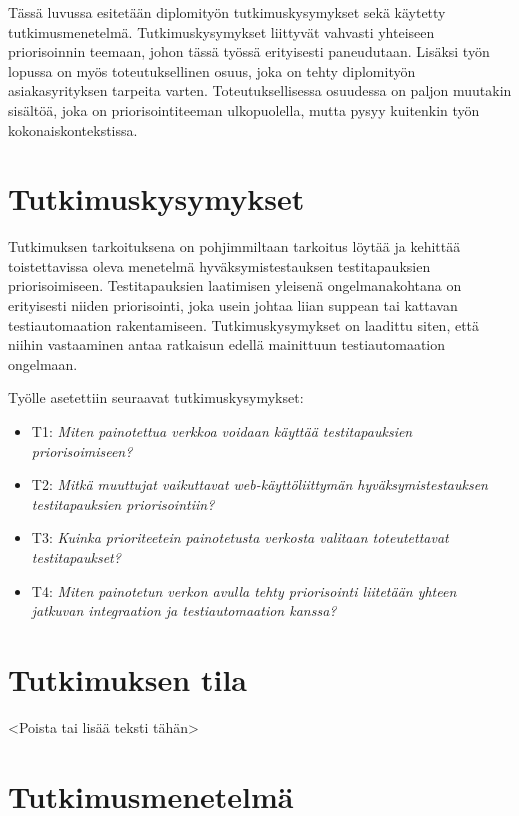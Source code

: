 Tässä luvussa esitetään diplomityön tutkimuskysymykset sekä käytetty tutkimusmenetelmä.
Tutkimuskysymykset liittyvät vahvasti yhteiseen priorisoinnin teemaan, johon tässä työssä erityisesti paneudutaan.
Lisäksi työn lopussa on myös toteutuksellinen osuus, joka on tehty diplomityön asiakasyrityksen tarpeita varten.
Toteutuksellisessa osuudessa on paljon muutakin sisältöä, joka on priorisointiteeman ulkopuolella, mutta pysyy kuitenkin työn kokonaiskontekstissa.

\section{Tutkimuskysymykset}

Tutkimuksen tarkoituksena on pohjimmiltaan tarkoitus löytää ja kehittää toistettavissa oleva menetelmä hyväksymistestauksen testitapauksien priorisoimiseen.
Testitapauksien laatimisen yleisenä ongelmanakohtana on erityisesti niiden priorisointi, joka usein johtaa liian suppean tai kattavan testiautomaation rakentamiseen.
Tutkimuskysymykset on laadittu siten, että niihin vastaaminen antaa ratkaisun edellä mainittuun testiautomaation ongelmaan.

Työlle asetettiin seuraavat tutkimuskysymykset:
\begin{itemize}
	\item T1: \emph{Miten painotettua verkkoa voidaan käyttää testitapauksien priorisoimiseen?}
  \item T2: \emph{Mitkä muuttujat vaikuttavat web-käyttöliittymän hyväksymistestauksen testitapauksien priorisointiin?}
  \item T3: \emph{Kuinka prioriteetein painotetusta verkosta valitaan toteutettavat testitapaukset?}
  \item T4: \emph{Miten painotetun verkon avulla tehty priorisointi liitetään yhteen jatkuvan integraation ja testiautomaation kanssa?}
\end{itemize}

\section{Tutkimuksen tila}

<Poista tai lisää teksti tähän>

\section{Tutkimusmenetelmä}

